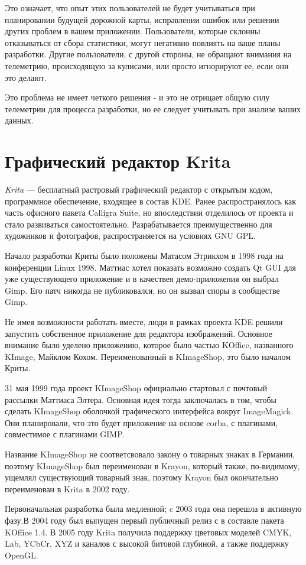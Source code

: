 Это означает, что опыт этих пользователей не будет учитываться при планировании будущей дорожной карты, исправлении ошибок или решении других проблем в вашем приложении. Пользователи, которые склонны отказываться от сбора статистики, могут негативно повлиять на ваше планы разработки. Другие пользователи, с другой стороны, не обращают внимания на телеметрию, происходящую за кулисами, или просто игнорируют ее, если они это делают.

Это проблема не имеет четкого решения - и это не отрицает общую силу телеметрии для процесса разработки, но ее следует учитывать при анализе ваших данных.
\section{Графический редактор Krita}
\textit{Krita} — бесплатный растровый графический редактор с открытым кодом, программное обеспечение, входящее в состав KDE. Ранее распространялось как часть офисного пакета Calligra Suite, но впоследствии отделилось от проекта и стало развиваться самостоятельно. Разрабатывается преимущественно для художников и фотографов, распространяется на условиях GNU GPL.

Начало разработки Криты было положены Матасом Этрикхом в 1998 года на конференции Linux 1998. Маттиас хотел показать возможно создать Qt GUI для уже существующего приложение и в качествея демо-приложения он выбрал Gimp. Его патч никогда не публиковался, но он вызвал споры в сообществе Gimp.

Не имея возможности работать вместе, люди в рамках проекта KDE решили запустить собственное приложение для редактора изображений. Основное внимание было уделено приложению, которое было частью KOffice, названного KImage, Майклом Кохом. Переименованный в KImageShop, это было началом Криты.

31 мая 1999 года проект KImageShop официально стартовал с почтовый рассылки Маттиаса Элтера. Основная идея тогда заключалась в том, чтобы сделать KImageShop оболочкой графического интерфейса вокруг ImageMagick. Они планировали, что это будет приложение  на основе corba,  с плагинами,  совместимое с плагинами GIMP.

Название KImageShop не соответсвовало закону о товарных знаках в Германии, поэтому KImageShop был переименован в Krayon, который также, по-видимому, ущемлял существующий товарный знак, поэтому Krayon был окончательно переименован в Krita в 2002 году.

Первоначальная разработка была медленной; c 2003 года  она перешла в активную фазу.В  2004 году был выпущен первый публичный релиз с в составле пакета KOffice 1.4. В 2005 году Krita получила поддержку цветовых моделей CMYK, Lab, YCbCr, XYZ и каналов с высокой битовой глубиной, а также поддержку OpenGL.

